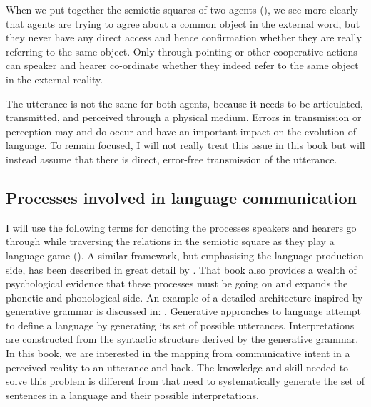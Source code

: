 When we put together the semiotic squares of two 
agents (), we see more clearly 
that agents are trying to agree about a common object
in the external word, but they never have 
any direct access and hence confirmation whether they 
are really referring to the same object. 
Only through pointing or other
cooperative actions can speaker and hearer co-ordinate
whether they indeed refer to the same object in
the external reality. 

The utterance is not the same for both agents, because it
needs to be articulated, transmitted, and perceived through 
a physical medium. Errors in transmission or perception may 
and do occur and have an important impact on the evolution of 
language. To remain focused, I will not really treat this issue in 
this book but will instead assume that there is direct, error-free transmission
of the utterance. 

\subsection{Processes involved in language communication}

I will use the following terms for denoting the 
processes speakers and hearers go through while traversing
the relations in the semiotic square as they play a language
game (). 
A similar framework, but emphasising the 
language production side, has been described in great
detail by \cite{Levelt:1989}. That book also provides a wealth
of psychological evidence that these processes must 
be going on and expands the phonetic and phonological 
side. An example of a detailed architecture inspired by 
generative grammar is discussed in: \cite{Jackendoff:1997}. 
Generative approaches to language attempt to define a language by 
generating its set of possible utterances. Interpretations
are constructed from the syntactic structure derived by 
the generative grammar. In this book, we are interested 
in the mapping from communicative intent 
in a perceived reality to an utterance and back. The knowledge
and skill needed to solve this problem is different from 
that need to systematically generate the set of sentences in a 
language and their possible interpretations.

